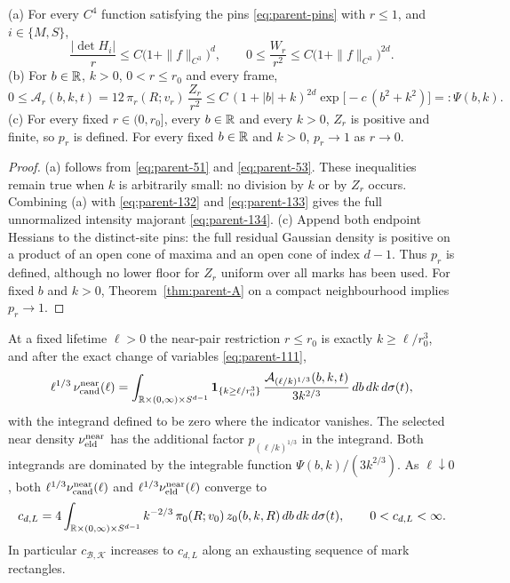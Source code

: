 \begin{lemma}\label{lem:parent-majorant}
\textup{(a)} For every $C^4$ function satisfying the pins \eqref{eq:parent-pins} with $r\le1$, and $i\in\{M,S\}$,
\begin{equation}\label{eq:parent-detbound}
\frac{|\det H_i|}r\le C\bigl(1+\|f\|_{C^3}\bigr)^d,\qquad 0\le\frac{W_r}{r^2}\le C\bigl(1+\|f\|_{C^3}\bigr)^{2d}.
\end{equation}
\textup{(b)} For $b\in\mathbb R$, $k>0$, $0<r\le r_0$ and every frame,
\begin{equation}\label{eq:parent-134}
0\le\mathcal A_r(b,k,t)=12\,\pi_r(R;v_r)\,\frac{Z_r}{r^2}\le C\,(1+|b|+k)^{2d}\exp\bigl[-c\,(b^2+k^2)\bigr]=:\Psi(b,k).
\end{equation}
\textup{(c)} For every fixed $r\in(0,r_0]$, every $b\in\mathbb R$ and every $k>0$, $Z_r$ is positive and finite, so $p_r$ is defined. For every fixed $b\in\mathbb R$ and $k>0$, $p_r\to1$ as $r\to0$.
\end{lemma}

\begin{proof}
(a) follows from \eqref{eq:parent-51} and \eqref{eq:parent-53}. These inequalities remain true when $k$ is arbitrarily small: no division by $k$ or by $Z_r$ occurs. Combining (a) with \eqref{eq:parent-132} and \eqref{eq:parent-133} gives the full unnormalized intensity majorant \eqref{eq:parent-134}. (c) Append both endpoint Hessians to the distinct-site pins: the full residual Gaussian density is positive on a product of an open cone of maxima and an open cone of index $d-1$. Thus $p_r$ is defined, although no lower floor for $Z_r$ uniform over all marks has been used. For fixed $b$ and $k>0$, Theorem~\ref{thm:parent-A} on a compact neighbourhood implies $p_r\to1$.
\end{proof}

\begin{proposition}\label{prop:parent-near}
At a fixed lifetime $\ell>0$ the near-pair restriction $r\le r_0$ is exactly $k\ge\ell/r_0^3$, and after the exact change of variables \eqref{eq:parent-111},
\begin{equation}\label{eq:parent-135}
\ell^{1/3}\,\nu^{\rm near}_{\mathrm{cand}}(\ell)=\int_{\mathbb R\times(0,\infty)\times S^{d-1}}\mathbf 1_{\{k\ge\ell/r_0^3\}}\,\frac{\mathcal A_{(\ell/k)^{1/3}}(b,k,t)}{3k^{2/3}}\,db\,dk\,d\sigma(t),
\end{equation}
with the integrand defined to be zero where the indicator vanishes. The selected near density $\nu^{\rm near}_{\mathrm{eld}}$ has the additional factor $p_{(\ell/k)^{1/3}}$ in the integrand. Both integrands are dominated by the integrable function $\Psi(b,k)/(3k^{2/3})$. As $\ell\downarrow0$, both $\ell^{1/3}\nu^{\rm near}_{\mathrm{cand}}(\ell)$ and $\ell^{1/3}\nu^{\rm near}_{\mathrm{eld}}(\ell)$ converge to
\begin{equation}\label{eq:parent-136}
c_{d,L}=4\int_{\mathbb R\times(0,\infty)\times S^{d-1}}k^{-2/3}\,\pi_0(R;v_0)\,z_0(b,k,R)\,db\,dk\,d\sigma(t),\qquad 0<c_{d,L}<\infty .
\end{equation}
In particular $c_{\mathcal B,\mathcal K}$ increases to $c_{d,L}$ along an exhausting sequence of mark rectangles.
\end{proposition}

